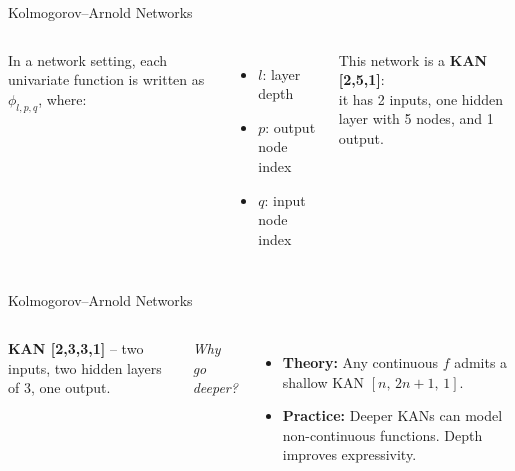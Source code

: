\documentclass[aspectratio=169]{beamer}
\begin{document}
\begin{frame}{Kolmogorov–Arnold Networks}
	
	\begin{columns}[T,onlytextwidth]
		
		\centering
		\resizebox{\linewidth}{!}{}
		
		In a network setting, each univariate function is written as $\phi_{l,p,q}$, where:
		\vspace{0.8em}
		\begin{itemize}
			\item $l$: layer depth  
			\item $p$: output node index  
			\item $q$: input node index
		\end{itemize}
		
		\vspace{1em}
		This network is a \textbf{KAN [2,5,1]}:\\it has 2 inputs, one hidden layer with 5 nodes, and 1 output.
		
	\end{columns}
	
\end{frame}


\begin{frame}{Kolmogorov–Arnold Networks}
	\begin{columns}[T,onlytextwidth]
		
		\column{0.5\textwidth}
		\centering
		\resizebox{\linewidth}{!}{}
		
		\column{0.45\textwidth}
		\textbf{KAN [2,3,3,1]} – two inputs, two hidden layers of 3, one output.
		
		\vspace{0.8em}
		\textit{Why go deeper?}
		\begin{itemize}
			\item \textbf{Theory:} Any continuous $f$ admits a shallow KAN \([n,\,2n{+}1,\,1]\).
			\item \textbf{Practice:} Deeper KANs can model non-continuous functions. Depth improves expressivity.
		\end{itemize}
		
	\end{columns}
\end{frame}
\end{document}
